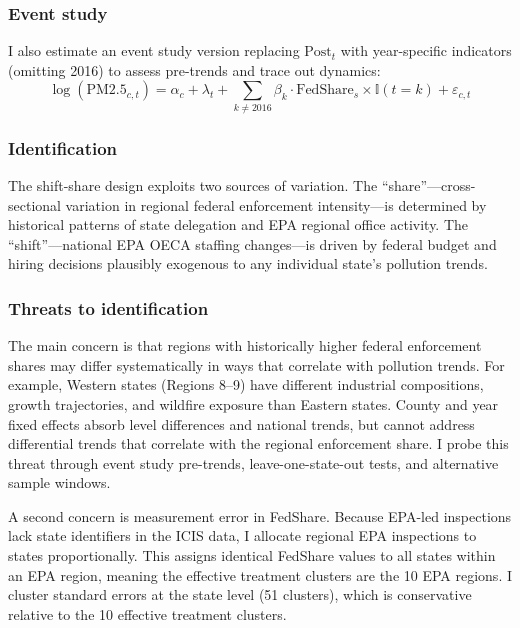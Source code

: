 \documentclass[12pt]{article}
\newcommand{\ind}{\mathbb{I}}
\begin{document}
\subsubsection*{Event study} I also estimate an event study version replacing $\text{Post}_t$ with year-specific indicators (omitting 2016) to assess pre-trends and trace out dynamics:
\begin{equation}\label{eq:eventstudy}
\log(\text{PM2.5}_{c,t}) = \alpha_c + \lambda_t + \sum_{k \neq 2016} \beta_k \cdot \text{FedShare}_s \times \ind(t = k) + \varepsilon_{c,t}
\end{equation}

\subsubsection*{Identification} The shift-share design exploits two sources of variation. The ``share''---cross-sectional variation in regional federal enforcement intensity---is determined by historical patterns of state delegation and EPA regional office activity. The ``shift''---national EPA OECA staffing changes---is driven by federal budget and hiring decisions plausibly exogenous to any individual state's pollution trends.

\subsubsection*{Threats to identification} The main concern is that regions with historically higher federal enforcement shares may differ systematically in ways that correlate with pollution trends. For example, Western states (Regions 8--9) have different industrial compositions, growth trajectories, and wildfire exposure than Eastern states. County and year fixed effects absorb level differences and national trends, but cannot address differential trends that correlate with the regional enforcement share. I probe this threat through event study pre-trends, leave-one-state-out tests, and alternative sample windows.

A second concern is measurement error in FedShare. Because EPA-led inspections lack state identifiers in the ICIS data, I allocate regional EPA inspections to states proportionally. This assigns identical FedShare values to all states within an EPA region, meaning the effective treatment clusters are the 10 EPA regions. I cluster standard errors at the state level (51 clusters), which is conservative relative to the 10 effective treatment clusters.
\end{document}
